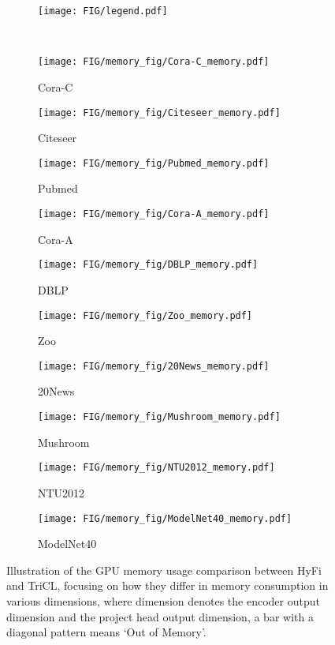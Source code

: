 \begin{figure*}[thbp!]
  \centering
  \begin{subfigure}[b]{0.2\textwidth}
    \texttt{[image: FIG/legend.pdf]}
  \end{subfigure}
  \\
  \begin{subfigure}[b]{0.19\textwidth}
    \texttt{[image: FIG/memory\_fig/Cora-C\_memory.pdf]}
    \caption{Cora-C}
  \end{subfigure}
  \begin{subfigure}[b]{0.19\textwidth}
    \texttt{[image: FIG/memory\_fig/Citeseer\_memory.pdf]}
    \caption{Citeseer}
  \end{subfigure}
  \begin{subfigure}[b]{0.19\textwidth}
    \texttt{[image: FIG/memory\_fig/Pubmed\_memory.pdf]}
    \caption{Pubmed}
  \end{subfigure}
  \begin{subfigure}[b]{0.19\textwidth}
    \texttt{[image: FIG/memory\_fig/Cora-A\_memory.pdf]}
    \caption{Cora-A}
  \end{subfigure}
  \begin{subfigure}[b]{0.19\textwidth}
    \texttt{[image: FIG/memory\_fig/DBLP\_memory.pdf]}
    \caption{DBLP}
  \end{subfigure}
  \begin{subfigure}[b]{0.19\textwidth}
    \texttt{[image: FIG/memory\_fig/Zoo\_memory.pdf]}
    \caption{Zoo}
  \end{subfigure}
  \begin{subfigure}[b]{0.19\textwidth}
    \texttt{[image: FIG/memory\_fig/20News\_memory.pdf]}
    \caption{20News}
  \end{subfigure}
  \begin{subfigure}[b]{0.19\textwidth}
    \texttt{[image: FIG/memory\_fig/Mushroom\_memory.pdf]}
    \caption{Mushroom}
  \end{subfigure}
  \begin{subfigure}[b]{0.19\textwidth}
    \texttt{[image: FIG/memory\_fig/NTU2012\_memory.pdf]}
    \caption{NTU2012}
  \end{subfigure}
  \begin{subfigure}[b]{0.19\textwidth}
    \texttt{[image: FIG/memory\_fig/ModelNet40\_memory.pdf]}
    \caption{ModelNet40}
  \end{subfigure}
  \caption{Illustration of the GPU memory usage comparison between HyFi and TriCL, focusing on how they differ in memory consumption in various dimensions, where dimension denotes the encoder output dimension and the project head output dimension, a bar with a diagonal pattern means `Out of Memory'.}
  \label{fig:memory}
\end{figure*}

